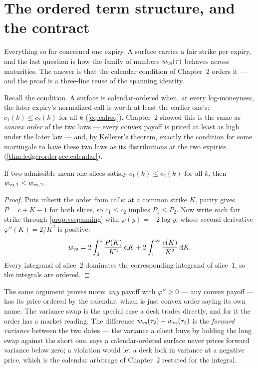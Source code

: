 \section{The ordered term structure, and the contract}
\label{sec:vsterm}

Everything so far concerned one expiry.  A surface carries a fair
strike per expiry, and the last question is how the family of numbers
$w_{\rm vs}(\tau)$ behaves across maturities.  The answer is that the
calendar condition of Chapter~2 orders it --- and the proof is a
three-line reuse of the spanning identity.

Recall the condition.  A surface is calendar-ordered when, at every
log-moneyness, the later expiry's normalized call is worth at least
the earlier one's: $c_1(k)\le c_2(k)$ for all $k$
(\cref{eq:calreq}).  Chapter~2 showed this is the same as
\emph{convex order} of the two laws --- every convex payoff is priced
at least as high under the later law --- and, by Kellerer's theorem,
exactly the condition for some martingale to have these two laws as
its distributions at the two expiries
(\cref{thm:ledgerorder,sec:calendar}).

\begin{proposition}
\label{prop:vsterm}
If two admissible mean-one slices satisfy $c_1(k)\le c_2(k)$ for all
$k$, then $w_{\rm vs,1}\le w_{\rm vs,2}$.
\end{proposition}

\begin{proof}
Puts inherit the order from calls: at a common strike $K$, parity
gives $P=c+K-1$ for both slices, so $c_1\le c_2$ implies
$P_1\le P_2$.  Now write each fair strike through
\cref{prop:vsspanning} with $\varphi(y)=-2\log y$, whose second
derivative $\varphi''(K)=2/K^{2}$ is positive:
\[
w_{\rm vs}
=2\int_0^{1}\frac{P(K)}{K^{2}}\,\mathrm{d} K
+2\int_1^{\infty}\frac{c(K)}{K^{2}}\,\mathrm{d} K .
\]
Every integrand of slice~2 dominates the corresponding integrand of
slice~1, so the integrals are ordered.
\end{proof}

The same argument proves more: \emph{any} payoff with
$\varphi''\ge0$ --- any convex payoff --- has its price ordered by
the calendar, which is just convex order saying its own name.  The
variance swap is the special case a desk trades directly, and for it
the order has a market reading.  The difference
$w_{\rm vs}(\tau_2)-w_{\rm vs}(\tau_1)$ is the \emph{forward
variance} between the two dates --- the variance a client buys by
holding the long swap against the short one.  
says a calendar-ordered surface never prices forward variance below
zero; a violation would let a desk lock in variance at a negative
price, which is the calendar arbitrage of Chapter~2 restated for the
integral.

